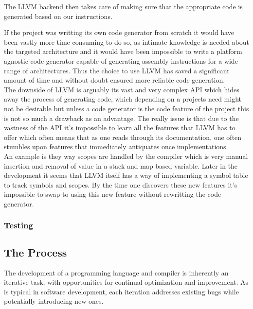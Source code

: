 The LLVM backend then takes care of making sure that the appropriate code is
generated based on our instructions.

If the project was writting its own code generator from scratch it would have been
vastly more time consuming to do so, as intimate knowledge is needed about the
targeted architecture and it would have been impossible to write a platform agnostic
code generator capable of generating assembly instructions for a wide range of
architectures. Thus the choice to use LLVM has saved a significant amount of time and
without doubt ensured more reliable code generation. \\

The downside of LLVM is arguably its vast and very complex API which hides away the
process of generating code, which depending on a projects need might not be desirable
but unless a code generator is the code feature of the project this is not so much a
drawback as an advantage. The really issue is that due to the vastness of the API
it's impossible to learn all the features that LLVM has to offer which often means
that as one reads through its documentation, one often stumbles upon features that
immediately antiquates once implementations. \\

An example is they way scopes are handled by the \lang{} compiler which is very
manual insertion and removal of value in a stack and map based variable. Later in the
development it seems that LLVM itself has a way of implementing a symbol table to
track symbols and scopes. By the time one discovers these new features it's
impossible to swap to using this new feature without rewritting the code generator.

\subsubsection{Testing}


\subsection{The Process}

The development of a programming language and compiler is inherently an iterative
task, with opportunities for continual optimization and improvement. As is typical in
software development, each iteration addresses existing bugs while potentially
introducing new ones. \\

